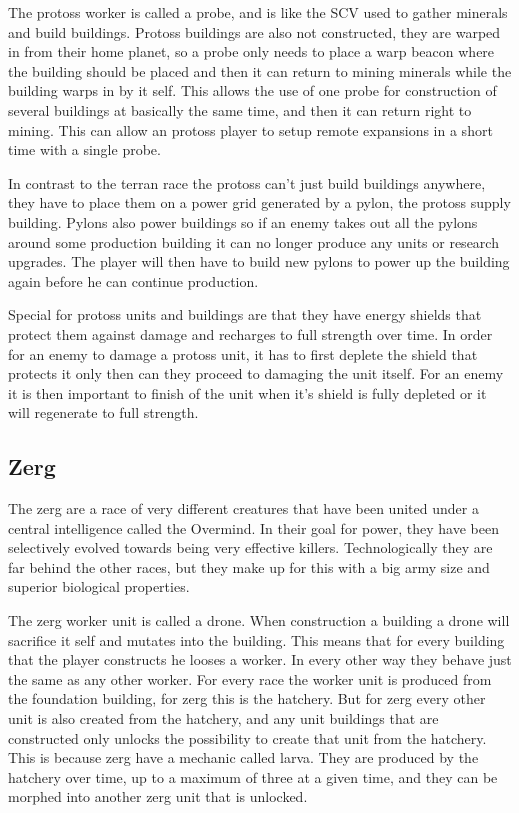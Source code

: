 The protoss worker is called a probe, and is like the SCV used to gather minerals and build buildings. Protoss buildings are also not constructed, they are warped in from their home planet, so a probe only needs to place a warp beacon where the building should be placed and then it can return to mining minerals while the building warps in by it self. This allows the use of one probe for construction of several buildings at basically the same time, and then it can return right to mining. This can allow an protoss player to setup remote expansions in a short time with a single probe. 

In contrast to the terran race the protoss can't just build buildings anywhere, they have to place them on a power grid generated by a pylon, the protoss supply building. Pylons also power buildings so if an enemy takes out all the pylons around some production building it can no longer produce any units or research upgrades. The player will then have to build new pylons to power up the building again before he can continue production. 

Special for protoss units and buildings are that they have energy shields that protect them against damage and recharges to full strength over time. In order for an enemy to damage a protoss unit, it has to first deplete the shield that protects it only then can they proceed to damaging the unit itself. For an enemy it is then important to finish of the unit when it's shield is fully depleted or it will regenerate to full strength. 

\subsection{Zerg}
 The zerg are a race of very different creatures that have been united under a central intelligence called the Overmind. In their goal for power, they have been selectively evolved towards being very effective killers. Technologically they are far behind the other races, but they make up for this with a big army size and superior biological properties. 

 The zerg worker unit is called a drone. When construction a building a drone will sacrifice it self and mutates into the building. This means that for every building that the player constructs he looses a worker. In every other way they behave just the same as any other worker. For every race the worker unit is produced from the foundation building, for zerg this is the hatchery. But for zerg every other unit is also created from the hatchery, and any unit buildings that are constructed only unlocks the possibility to create that unit from the hatchery. This is because zerg have a mechanic called larva. They are produced by the hatchery over time, up to a maximum of three at a given time, and they can be morphed into another zerg unit that is unlocked. 

